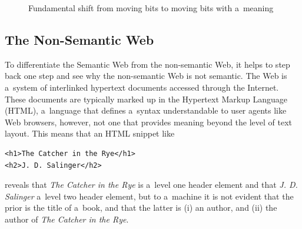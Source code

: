 \begin{figure}[!ht]
\centering
  \caption{Fundamental shift from moving bits to moving bits with a~meaning}
  \label{fig:fundamental-shift}
\end{figure}

\subsection{The Non-Semantic Web} \label{sec:non-semantic-web}

To differentiate the Semantic Web from the non-semantic Web,
it helps to step back one step and
see why the non-semantic Web is not semantic.
The Web is a~system of interlinked hypertext documents
accessed through the Internet.
These documents are typically marked up in
the Hypertext Markup Language (HTML),
a~language that defines a~syntax
understandable to user agents like Web browsers,
however, not one that provides meaning
beyond the level of text layout.
This means that an HTML snippet like
\begin{verbatim}
<h1>The Catcher in the Rye</h1>
<h2>J. D. Salinger</h2>
\end{verbatim}
reveals that \emph{The Catcher in the Rye}
is a~level one header element and
that \emph{J. D. Salinger} a~level two header element,
but to a~machine it is not evident that the prior
is the title of a~book,
and that the latter is (i) an author, and (ii)
the author of \emph{The Catcher in the Rye}.

